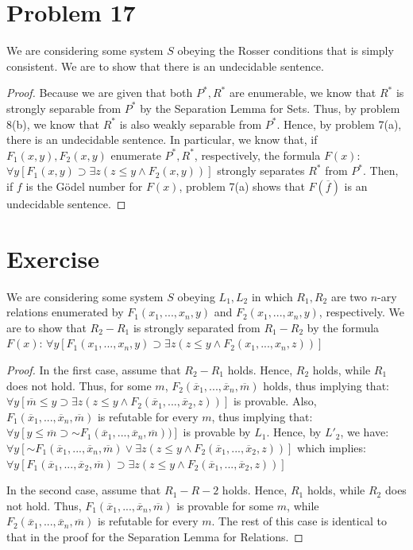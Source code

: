 \documentclass{article}
\newcommand*{\oldneg}{\mathord{\sim}}
\theoremstyle{definition}
\begin{document}
\section*{Problem 17}
We are considering some system $S$ obeying the Rosser conditions that is simply consistent. We are to show that there is an undecidable sentence. 
\begin{proof}
Because we are given that both $P^*, R^*$ are enumerable, we know that $R^*$ is strongly separable from $P^*$ by the Separation Lemma for Sets. 
Thus, by problem 8(b), we know that $R^*$ is also weakly separable from $P^*$. Hence, by problem 7(a), there is an undecidable sentence. 
In particular, we know that, if $F_1(x, y), F_2(x, y)$ enumerate $P^*, R^*$, respectively, the formula $F(x)$:\newline
$\forall y[F_1(x, y) \supset \exists z(z \le y \wedge F_2(x, y))]$\newline
strongly separates $R^*$ from $P^*$. Then, if $f$ is the Gödel number for $F(x)$, problem 7(a) shows that $F(\overline f)$ is an undecidable sentence.
\end{proof}  
\section*{Exercise}
We are considering some system $S$ obeying $L_1, L_2$ in which $R_1, R_2$ are two $n$-ary relations enumerated by $F_1(x_1,...,x_n, y)$ and
$F_2(x_1,...,x_n, y)$, respectively. We are to show that $R_2-R_1$ is strongly separated from $R_1-R_2$ by the formula $F(x)$:\newline
$\forall y[F_1(x_1,...,x_n, y) \supset \exists z(z \le y\wedge F_2(x_1, . . . ,x_n, z))]$
\begin{proof}
In the first case, assume that $R_2-R_1$ holds. Hence, $R_2$ holds, while $R_1$ does not hold. Thus, for some $m$, 
$F_2(\overline x_1,...,\overline x_n, \overline m)$ holds, thus implying that:\newline 
$\forall y[\overline m\le y\supset \exists z(z\le y\wedge F_2(\overline x_1,...,\overline x_2, z))]$ 
is provable. Also, $F_1(\overline x_1,...,\overline x_n,\overline m)$ is refutable for every $m$, thus implying that:\newline 
$\forall y[y\le\overline m\supset \oldneg F_1(\overline x_1,...,\overline x_n,\overline m))]$
is provable by $L_1$. Hence, by $L'_2$, we have:\newline
$\forall y[\oldneg F_1(\overline x_1,...,\overline x_n, \overline m) \vee \exists z(z\le y\wedge F_2(\overline x_1,...,\overline x_2, z))]$
which implies:\newline
$\forall y[F_1(\overline x_1,...,\overline x_2, \overline m) \supset \exists z(z\le y\wedge F_2(\overline x_1,...,\overline x_2, z))]$

In the second case, assume that $R_1-R-2$ holds. Hence, $R_1$ holds, while $R_2$ does not hold. Thus, $F_1(\overline x_1,...,\overline x_n,\overline m)$
is provable for some $m$, while $F_2(\overline x_1,...,\overline x_n,\overline m)$ is refutable for every $m$. The rest of this case is identical to that
in the proof for the Separation Lemma for Relations.
\end{proof}
\end{document}
